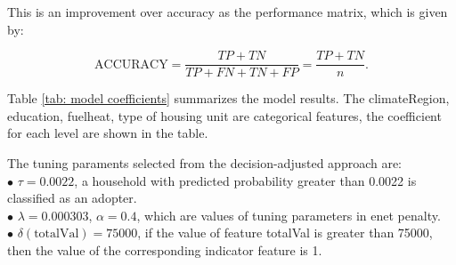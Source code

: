 This is an improvement over accuracy as the performance matrix, which
is given by:

\begin{equation*}
        \text{ACCURACY}=\frac{TP+TN}{TP+FN+TN+FP}=\frac{TP+TN}{n}.
        \end{equation*}


Table \ref{tab: model coefficients} summarizes the model results. The climateRegion, education, fuelheat, type of housing unit are categorical features, the coefficient for each level are shown in the table.

The tuning paraments selected from the decision-adjusted approach are: \\
$\bullet$ $\tau = 0.0022$, a household with predicted probability greater than 0.0022 is classified as an adopter.\\
$\bullet$ $\lambda = 0.000303$, $\alpha = 0.4$, which are values of tuning parameters in enet penalty.\\
$\bullet$ $\delta(\text{totalVal}) = 75000$, if the value of feature totalVal is greater than 75000, then the value of the corresponding indicator feature is 1.\\

